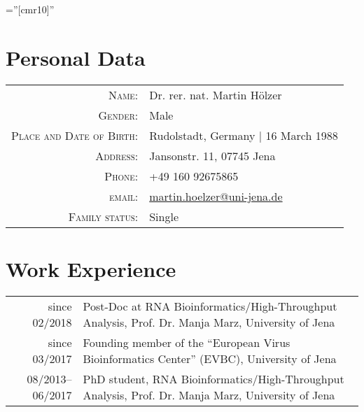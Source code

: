 \documentclass[a4paper,10pt]{article} %
\begin{document}
\pagestyle{empty} %
\font\fb=''[cmr10]'' %

\par{\bigskip\par} %

\section{Personal Data}

\begin{tabular}{rl}
\textsc{Name:} 						& Dr. rer. nat. Martin Hölzer \\
\textsc{Gender:}                  	& Male \\
\textsc{Place and Date of Birth:} 	& Rudolstadt, Germany  | 16 March 1988  \\
\textsc{Address:} 					& Jansonstr. 11, 07745 Jena  \\
\textsc{Phone:} 					& +49 160 92675865\\
\textsc{email:} 					& \href{mailto:martin.hoelzer@uni-jena.de}{martin.hoelzer@uni-jena.de} \\
\textsc{Family status:}				& Single \\
\end{tabular}

\section{Work Experience}

\begin{tabular}{r|p{11cm}}
since 02/2018             	& Post-Doc at RNA Bioinformatics/High-Throughput Analysis, 
								Prof. Dr. Manja Marz, University of Jena \\
since 03/2017            	& Founding member of the ``European Virus Bioinformatics Center'' 
                            	(EVBC), University of Jena \\
08/2013--06/2017            & PhD student, RNA Bioinformatics/High-Throughput Analysis, 
								Prof. Dr. Manja Marz, University of Jena \\					
\end{tabular}
\end{document}
